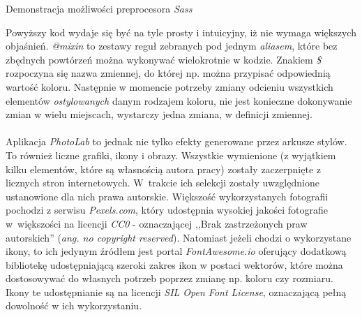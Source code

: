\begin{listing}[ht]
    \caption{Demonstracja możliwości preprocesora \textit{Sass}}
    \label{listing:sass-example}
\end{listing}

\noindent Powyższy kod wydaje się być na tyle prosty i intuicyjny, iż nie wymaga większych objaśnień. \textit{@mixin} to zestawy reguł zebranych pod jednym \textit{aliasem}, które bez zbędnych powtórzeń można wykonywać wielokrotnie w kodzie. Znakiem \textit{\$} rozpoczyna się nazwa zmiennej, do której np. można przypisać odpowiednią wartość koloru. Następnie w momencie potrzeby zmiany odcieniu wszystkich elementów \textit{ostylowanych} danym rodzajem koloru, nie jest konieczne dokonywanie zmian w wielu miejscach, wystarczy jedna zmiana, w definicji zmiennej. \\
\\
Aplikacja \textit{PhotoLab} to jednak nie tylko efekty generowane przez arkusze stylów. To również liczne grafiki, ikony i obrazy. Wszystkie wymienione (z wyjątkiem kilku elementów, które są własnością autora pracy) zostały zaczerpnięte z licznych stron internetowych. W~trakcie ich selekcji zostały uwzględnione ustanowione dla nich prawa autorskie. Większość wykorzystanych fotografii pochodzi z serwisu \textit{Pexels.com}, który udostępnia wysokiej jakości fotografie w~większości na licencji \textit{CC0} - oznaczającej ,,Brak zastrzeżonych praw autorskich'' (\textit{ang. no copyright reserved}). Natomiast jeżeli chodzi o wykorzystane ikony, to ich jedynym źródłem jest portal \textit{FontAwesome.io} oferujący dodatkową bibliotekę udostępniającą szeroki zakres ikon w postaci wektorów, które można dostosowywać do własnych potrzeb poprzez zmianę np. koloru czy rozmiaru. Ikony te udostępnianie są na licencji \textit{SIL Open Font License}, oznaczającą pełną dowolność w ich wykorzystaniu.
\newpage

\vspace*{0.01\baselineskip}

